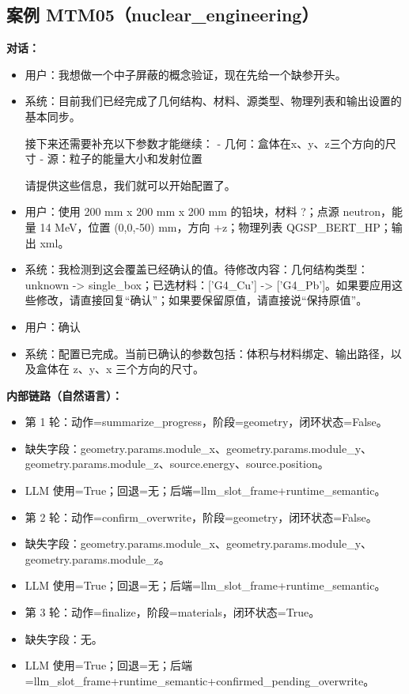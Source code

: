 \documentclass[11pt]{ctexart}
\begin{document}
\subsection{案例 MTM05（nuclear\_engineering）}
\textbf{对话：}
\begin{itemize}
\item 用户：我想做一个中子屏蔽的概念验证，现在先给一个缺参开头。
\item 系统：目前我们已经完成了几何结构、材料、源类型、物理列表和输出设置的基本同步。

接下来还需要补充以下参数才能继续：
- 几何：盒体在x、y、z三个方向的尺寸
- 源：粒子的能量大小和发射位置

请提供这些信息，我们就可以开始配置了。
\item 用户：使用 200 mm x 200 mm x 200 mm 的铅块，材料 ?；点源 neutron，能量 14 MeV，位置 (0,0,-50) mm，方向 +z；物理列表 QGSP\_BERT\_HP；输出 xml。
\item 系统：我检测到这会覆盖已经确认的值。待修改内容：几何结构类型：unknown -> single\_box；已选材料：['G4\_Cu'] -> ['G4\_Pb']。如果要应用这些修改，请直接回复“确认”；如果要保留原值，请直接说“保持原值”。
\item 用户：确认
\item 系统：配置已完成。当前已确认的参数包括：体积与材料绑定、输出路径，以及盒体在 z、y、x 三个方向的尺寸。
\end{itemize}
\textbf{内部链路（自然语言）：}
\begin{itemize}
\item 第 1 轮：动作=summarize\_progress，阶段=geometry，闭环状态=False。
\item 缺失字段：geometry.params.module\_x、geometry.params.module\_y、geometry.params.module\_z、source.energy、source.position。
\item LLM 使用=True；回退=无；后端=llm\_slot\_frame+runtime\_semantic。
\item 第 2 轮：动作=confirm\_overwrite，阶段=geometry，闭环状态=False。
\item 缺失字段：geometry.params.module\_x、geometry.params.module\_y、geometry.params.module\_z。
\item LLM 使用=True；回退=无；后端=llm\_slot\_frame+runtime\_semantic。
\item 第 3 轮：动作=finalize，阶段=materials，闭环状态=True。
\item 缺失字段：无。
\item LLM 使用=True；回退=无；后端=llm\_slot\_frame+runtime\_semantic+confirmed\_pending\_overwrite。
\end{itemize}
\end{document}
